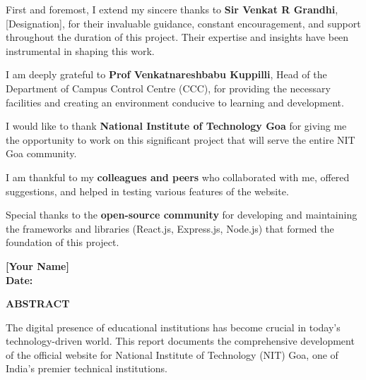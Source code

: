 \documentclass[12pt,a4paper]{report}
\begin{document}
\vspace{0.5cm}

First and foremost, I extend my sincere thanks to \textbf{Sir Venkat R Grandhi}, [Designation], for their invaluable guidance, constant encouragement, and support throughout the duration of this project. Their expertise and insights have been instrumental in shaping this work.

\vspace{0.5cm}

I am deeply grateful to \textbf{Prof Venkatnareshbabu Kuppilli}, Head of the Department of Campus Control Centre (CCC), for providing the necessary facilities and creating an environment conducive to learning and development.

\vspace{0.5cm}

I would like to thank \textbf{National Institute of Technology Goa} for giving me the opportunity to work on this significant project that will serve the entire NIT Goa community.

\vspace{0.5cm}

I am thankful to my \textbf{colleagues and peers} who collaborated with me, offered suggestions, and helped in testing various features of the website.

\vspace{0.5cm}

Special thanks to the \textbf{open-source community} for developing and maintaining the frameworks and libraries (React.js, Express.js, Node.js) that formed the foundation of this project.

\vspace{2cm}

\noindent\textbf{[Your Name]}\\
\textbf{Date:} \hrulefill

\newpage
\thispagestyle{empty}
\begin{center}
{\LARGE\bfseries ABSTRACT}\\[2cm]
\end{center}

The digital presence of educational institutions has become crucial in today's technology-driven world. This report documents the comprehensive development of the official website for National Institute of Technology (NIT) Goa, one of India's premier technical institutions.

\vspace{0.5cm}
\end{document}
